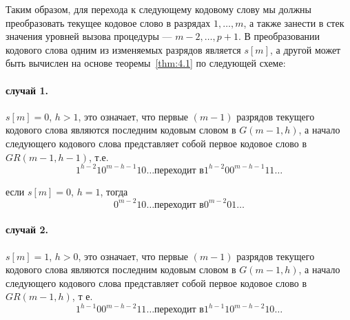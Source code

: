 \documentclass[12pt,a4paper]{article}
\newcommand{\led}[1]{edge from parent node[left,draw=none] {#1}}
\newcommand{\red}[1]{edge from parent node[right,draw=none] {#1}}
\theoremstyle{plain}
\theoremstyle{definition}
\theoremstyle{remark}
\begin{document}
\begin{center}
\end{center}

Таким образом, для перехода к следующему кодовому слову мы должны преобразовать текущее кодовое слово в разрядах $1,\ldots,m$, а также занести в стек значения уровней вызова процедуры \verb@G@ --- $m-2,\ldots,p+1$. В преобразовании кодового слова одним из изменяемых разрядов является $s[m]$, а другой может быть вычислен на основе теоремы~\ref{thm:4.1} по следующей схеме:

\paragraph*{случай 1.} $s[m]=0$, $h>1$, это означает, что первые $(m-1)$ разрядов текущего кодового слова являются последним кодовым словом в $G(m-1,h)$, а начало следующего кодового слова представляет собой первое кодовое слово в $GR(m-1,h-1)$, т.е.
\[1^{h-2}10^{m-h-1}10\ldots \text{переходит в} 1^{h-2}00^{m-h-1}11\ldots \]

если $s[m]=0$, $h=1$, тогда
\[ 0^{m-2}10\ldots \text{переходит в} 0^{m-2}01\ldots \]

\paragraph*{случай 2.} $s[m]=1$, $h>0$, это означает, что первые $(m-1)$ разрядов текущего кодового слова являются последним кодовым словом в $G(m-1,h)$, а начало следующего кодового слова представляет собой первое кодовое слово в $GR(m-1,h)$, т е.
\[1^{h-1}00^{m-h-2}11\ldots \text{переходит в} 1^{h-1}10^{m-h-2}10\ldots \]
\end{document}
